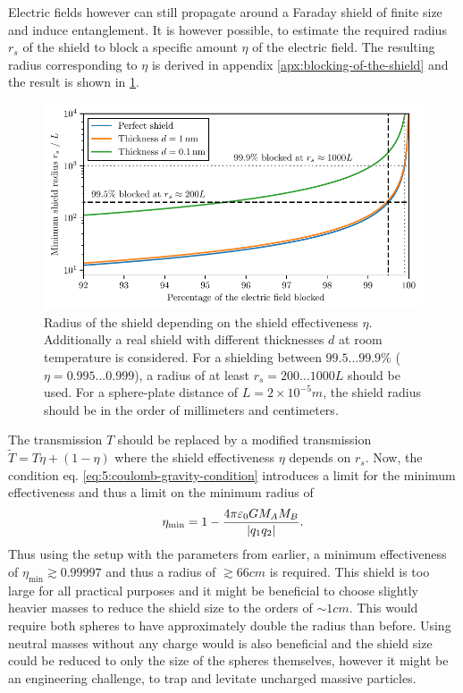 Electric fields however can still propagate around a Faraday shield of finite size and induce entanglement. It is however possible, to estimate the required radius $r_s$ of the shield to block a specific amount $\eta$ of the electric field.
The resulting radius corresponding to $\eta$ is derived in appendix \ref{apx:blocking-of-the-shield} and the result is shown in \cref{fig:5:shield-radius}.
\begin{figure}[!ht]
  \centering
  \includegraphics[width=\textwidth]{./../figures/shield-radius.pdf}
  \caption{Radius of the shield depending on the shield effectiveness $\eta$. Additionally a real shield with different thicknesses $d$ at room temperature is considered. For a shielding between $99.5...99.9\%$ ($\eta = 0.995...0.999$), a radius of at least $r_s =200...1000L$ should be used. For a sphere-plate distance of $L=2 \times 10^{-5}\si{m}$, the shield radius should be in the order of millimeters and centimeters.}
  \label{fig:5:shield-radius}
\end{figure}
The transmission $T$ should be replaced by a modified transmission $\tilde{T} = T\eta + (1-\eta)$ where the shield effectiveness $\eta$ depends on $r_s$. 
Now, the condition eq. \eqref{eq:5:coulomb-gravity-condition} introduces a limit for the minimum effectiveness and thus a limit on the minimum radius of
\begin{equation}
  \eta_\mathrm{min} = 1 - \frac{4\pi \varepsilon_0 G M_A M_B}{\left\lvert q_1 q_2\right\rvert} .
\end{equation}
Thus using the setup with the parameters from earlier, a minimum effectiveness of $\eta_\mathrm{min} \gtrsim 0.99997$ and thus a radius of $\gtrsim 66\si{cm}$ is required.
This shield is too large for all practical purposes and it might be beneficial to choose slightly heavier masses to reduce the shield size to the orders of $\sim 1\si{cm}$. This would require both spheres to have approximately double the radius than before.
Using neutral masses without any charge would is also beneficial and the shield size could be reduced to only the size of the spheres themselves, however it might be an engineering challenge, to trap and levitate uncharged massive particles.





